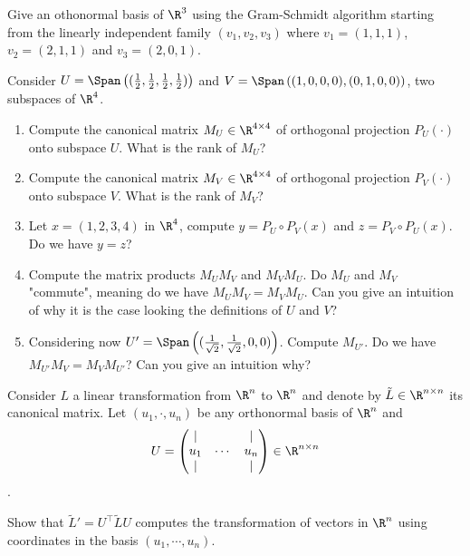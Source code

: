 \documentclass[11pt,nocut]{article}
\begin{document}



\begin{problem}[2.5 points]
    Give an othonormal basis of $\R^3$ using the Gram-Schmidt algorithm starting from the linearly independent family $(v_1, v_2, v_3)$ where $v_1 = (1, 1, 1)$, $v_2 = (2, 1, 1)$ and $v_3 = (2, 0, 1)$.
\end{problem}

\vspace{1cm}

\begin{problem}[2.5 points]
    Consider $ U = \Span\left((\frac 1 2, \frac 1 2, \frac 1 2, \frac 1 2)\right)$ and $V = \Span\left((1, 0, 0, 0),(0, 1, 0, 0)\right)$, two subspaces of $\R^4$.
    \begin{enumerate}[label=\normalfont(\textbf{\alph*})]
        \item Compute the canonical matrix $M_U \in \R^{4\times 4}$ of orthogonal projection $P_U(\cdot)$ onto subspace $U$. What is the rank of $M_U$?
        \item Compute the canonical matrix $M_V \in \R^{4\times 4}$ of orthogonal projection $P_V(\cdot)$ onto subspace $V$. What is the rank of $M_V$?
        \item Let $x=(1,2,3,4)$ in $\R^4$, compute $y = P_U \circ P_V (x)$ and $z = P_V \circ P_U (x)$. Do we have $y = z$? 
        \item Compute the matrix products $M_U M_V$ and $M_V M_U$. Do $M_U$ and $M_V$ "commute", meaning do we have $M_U M_V = M_V M_U$. Can you give an intuition of why it is the case looking the definitions of $U$ and $V$?
        \item Considering now $ U' = \Span\left((\frac{1}{\sqrt{2}}, \frac{1}{ \sqrt{2}}, 0, 0)\right)$. Compute $M_{U'}$. Do we have $M_{U'}M_V = M_{V}M_{U'}$? Can you give an intuition why?
    \end{enumerate}
\end{problem}

\vspace{1cm}

\begin{problem}[1 points]  
    Consider $L$ a linear transformation from $\R^n$ to $\R^n$ and denote by $\tilde L \in \R^{n \times n}$ its canonical matrix. Let $(u_1, \cdot, u_n)$ be any orthonormal basis of $\R^n$ and 
    $$ U = \begin{pmatrix}
        | & & | \\
        u_1 & \cdots & u_n\\
        | & & |
    \end{pmatrix}\in \R^{n \times n}$$.

Show that $\tilde L ' = U^\top \tilde L U$ computes the transformation of vectors in $\R^n$ using coordinates in the basis $(u_1, \cdots, u_n)$.

\end{problem}
\end{document}
